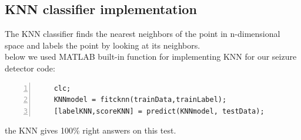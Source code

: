 \documentclass[11pt]{article}
\begin{document}
\subsection{KNN classifier implementation}
The KNN classifier finds the nearest neighbors of the point in n-dimensional space
and labels the point by looking at its neighbors. \\
below we used MATLAB built-in function for implementing KNN for our seizure detector
code: \\
\begin{lstlisting}[backgroundcolor=\color{lbcolor}, frame=single,
    numbers=left,style=Matlab-editor]
    %% KNN
    clc;
    KNNmodel = fitcknn(trainData,trainLabel);
    [labelKNN,scoreKNN] = predict(KNNmodel, testData);  
\end{lstlisting}

the KNN gives 100\% right answers on this test. \\
\end{document}
